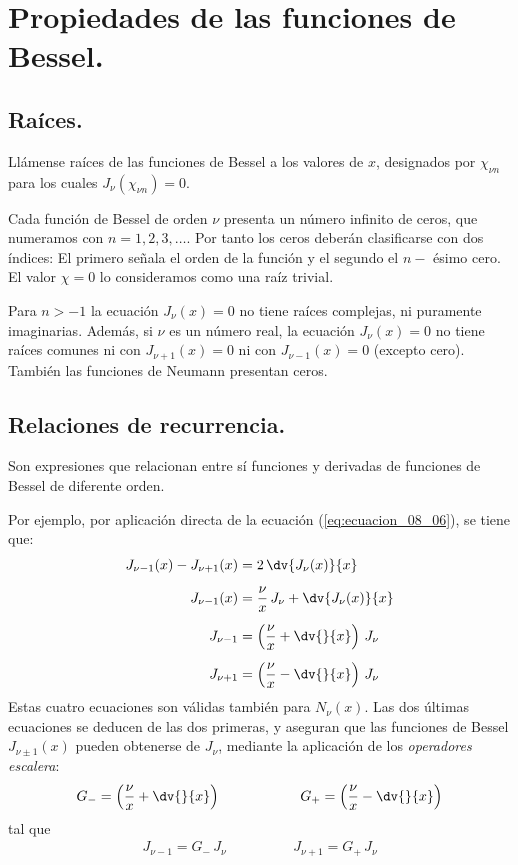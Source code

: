 \section{Propiedades de las funciones de Bessel.}
\subsection{Raíces.}

Llámense raíces de las funciones de Bessel a los valores de $x$, designados por $\chi_{\nu n}$ para los cuales $J_{\nu} (\chi_{\nu n}) = 0$. 
\par
Cada función de Bessel de orden $\nu$ presenta un número infinito de ceros, que numeramos con $n = 1, 2, 3, \ldots$. Por tanto los ceros deberán clasificarse con dos índices: El primero señala el orden de la función y el segundo el $n-$ ésimo cero. El valor $\chi = 0$ lo consideramos como una raíz trivial.
\par
Para $n > -1$ la ecuación $J_{\nu} (x) = 0$ no tiene raíces complejas, ni puramente imaginarias. Además, si $\nu$ es un número real, la ecuación $J_{\nu} (x) = 0$ no tiene raíces comunes ni con $J_{\nu+1} (x) = 0$ ni con $J_{\nu-1} (x) = 0$ (excepto cero). También las funciones de Neumann presentan ceros.

\subsection{Relaciones de recurrencia.}

Son expresiones que relacionan entre sí funciones y derivadas de funciones de Bessel de diferente orden.
\par
Por ejemplo, por aplicación directa de la ecuación (\ref{eq:ecuacion_08_06}), se tiene que:
\begin{align*}
J_{\nu-1} (x) - J_{\nu+1} (x)&= 2 \, \dv{J_{\nu}(x)}{x} \\[0.5em]
J_{\nu-1} (x) &= \dfrac{\nu}{x} \, J_{\nu} + \dv{J_{\nu}(x)}{x} \\[0.5em]
J_{\nu-1} &= \left( \dfrac{\nu}{x} + \dv{}{x} \right) \, J_{\nu} \\[0.5em]
J_{\nu+1} &= \left( \dfrac{\nu}{x} - \dv{}{x} \right) \, J_{\nu}
\end{align*}
Estas cuatro ecuaciones son válidas también para $N_{\nu} (x)$. Las dos últimas ecuaciones se deducen de las dos primeras, y aseguran que las funciones de Bessel $J_{\nu \pm 1} (x)$ pueden obtenerse de $J_{\nu}$, mediante la aplicación de los \emph{operadores escalera}:
\begin{align*}
G_{-} = \left( \dfrac{\nu}{x} + \dv{}{x} \right) \hspace{2cm} G_{+} = \left( \dfrac{\nu}{x} - \dv{}{x} \right)
\end{align*}
tal que
\begin{align*}
J_{\nu-1} = G_{-} \, J_{\nu} \hspace{2cm} J_{\nu+1} = G_{+} \, J_{\nu}
\end{align*}

